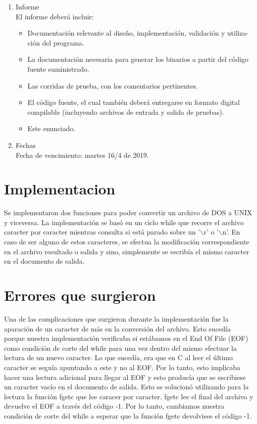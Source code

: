 \documentclass[a4paper,11pt]{article}
\begin{document}
\begin{enumerate}
\item Informe \\
El informe deberá incluir:

\begin{itemize}
\item Documentación relevante al diseño, implementación, validación y utiliza-
ción del programa.

\item La documentación necesaria para generar los binarios a partir del código
fuente suministrado.

\item Las corridas de prueba, con los comentarios pertinentes.

\item El código fuente, el cual también deberá entregarse en formato digital compilable (incluyendo archivos de entrada y salida de pruebas).

\item Este enunciado.
\end{itemize}

\item Fechas \\
Fecha de vencimiento: martes 16/4 de 2019.

\end{enumerate}

\newpage

\section{Implementacion}
Se implementaron dos funciones para poder convertir un archivo de DOS a UNIX y viceversa. La implementaci\'on se basó en un ciclo while que recorre el archivo caracter por caracter mientras consulta si está parado sobre un '$\backslash$r' o '$\backslash$n'. En caso de ser alguno de estos caracteres, se efectua la modificación correspondiente en el archivo resultado o salida y sino, simplemente se escribía el mismo caracter en el documento de salida.


\section{Errores que surgieron}
Una de las complicaciones que surgieron durante la implementación fue la aparación de un caracter de más en la conversi\'on del archivo. Esto sucedía porque nuestra implementación verificaba si estábamos en el End Of File (EOF) como condición de corte del while para una vez dentro del mismo efectuar la lectura de un nuevo caracter. Lo que suced\'ia, era que en C al leer el \'ultimo caracter se segu\'ia apuntando a este y no al EOF. Por lo tanto, esto implicaba hacer una lectura adicional para llegar al EOF y esto produc\'ia que se escribiese un caracter vac\'io en el documento de salida. Esto se solucion\'o utilizando para la lectura la funci\'on fgetc que lee caracer por caracter. fgetc lee el final del archivo y devuelve el EOF a trav\'es del c\'odigo -1. Por lo tanto, cambiamos nuestra condici\'on de corte del while a esperar que la funci\'on fgetc devolviese el c\'odigo -1.
\end{document}
